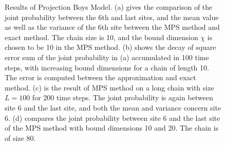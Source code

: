 \documentclass[english]{article}[12pt]
\begin{document}
\begin{figure}[H]
  \caption{Results of Projection Boys Model. (a) gives the comparison of the joint probability between the 6th and last sites, and the mean value as well as the variance of the 6th site between the MPS method and exact method. The chain size is 10, and the bound dimension $\chi$ is chosen to be 10 in the MPS method. (b) shows the decay of square error sum of the joint probability in (a) accumulated in 100 time steps, with increasing bound dimensions for a chain of length 10. The error is computed between the approximation and exact method. (c) is the result of MPS method on a long chain with size $L=100$ for 200 time steps. The joint probability is again between site 6 and the last site, and both the mean and variance concern site 6. (d) compares the joint probability between site 6 and the last site of the MPS method with bound dimensions 10 and 20. The chain is of size 80.}
  \label{fig:Projection_result}
\end{figure}
\end{document}
